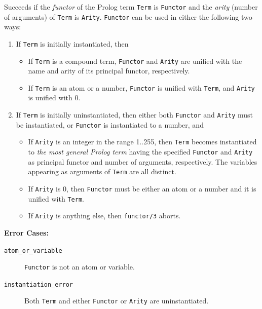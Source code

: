 \begin{description}
    Succeeds if the {\em functor} of the Prolog term {\tt Term} is 
    {\tt Functor} and the {\em arity} (number of arguments) of {\tt Term} is
    {\tt Arity}\@.  {\tt Functor} can be used in either the following two 
    ways:
    \begin{enumerate}
    \item If {\tt Term} is initially instantiated, then
          \begin{itemize}
          \item If {\tt Term} is a compound term, {\tt Functor} and 
                {\tt Arity} are unified with the name and arity of 
                its principal functor, respectively. 
          \item If {\tt Term} is an atom or a number, {\tt Functor} is 
                unified with {\tt Term}, and {\tt Arity} is unified with 0.
          \end{itemize}
    \item If {\tt Term} is initially uninstantiated, then either both 
          {\tt Functor} and {\tt Arity} must be instantiated, or {\tt Functor}
          is instantiated to a number, and
          \begin{itemize}
          \item If {\tt Arity} is an integer in the range 1..255, then
                {\tt Term} becomes instantiated to {\em the most general 
                Prolog term} having the specified {\tt Functor} and 
                {\tt Arity} as principal functor and number of arguments,
                respectively. The variables appearing as arguments of 
                {\tt Term} are all distinct.
          \item If {\tt Arity} is 0, then {\tt Functor} must be either an 
                atom or a number and it is unified with {\tt Term}. 
          \item If {\tt Arity} is anything else, then {\tt functor/3} aborts.
          \end{itemize}
    \end{enumerate}

{\bf Error Cases:}
    \begin{description}
    \item[{\tt atom\_or\_variable}]
	{\tt Functor} is not an atom or variable.
    \item[{\tt instantiation\_error}]
	Both {\tt Term} and either {\tt Functor} or {\tt Arity} are 
	uninstantiated.
    \end{description}


\end{description}
